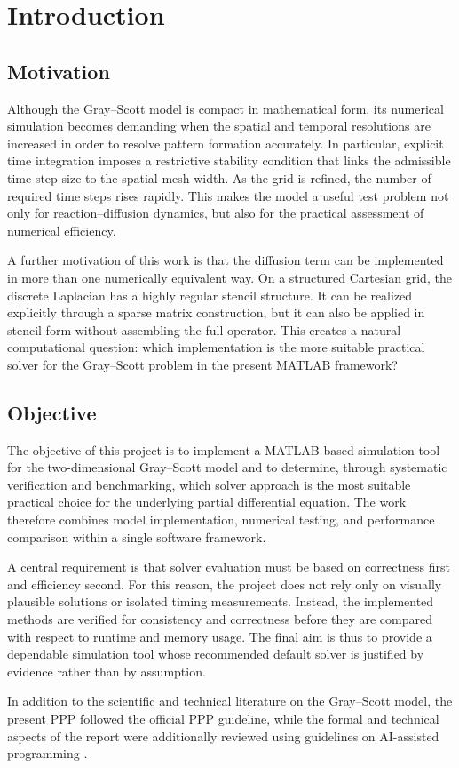 \chapter{Introduction}

\section{Motivation}

Although the Gray--Scott model is compact in mathematical form, its numerical simulation becomes demanding when the spatial and temporal resolutions are increased in order to resolve pattern formation accurately. In particular, explicit time integration imposes a restrictive stability condition that links the admissible time-step size to the spatial mesh width. As the grid is refined, the number of required time steps rises rapidly. This makes the model a useful test problem not only for reaction--diffusion dynamics, but also for the practical assessment of numerical efficiency.

A further motivation of this work is that the diffusion term can be implemented in more than one numerically equivalent way. On a structured Cartesian grid, the discrete Laplacian has a highly regular stencil structure. It can be realized explicitly through a sparse matrix construction, but it can also be applied in stencil form without assembling the full operator. This creates a natural computational question: which implementation is the more suitable practical solver for the Gray--Scott problem in the present MATLAB framework?

\section{Objective}

The objective of this project is to implement a MATLAB-based simulation tool for the two-dimensional Gray--Scott model and to determine, through systematic verification and benchmarking, which solver approach is the most suitable practical choice for the underlying partial differential equation. The work therefore combines model implementation, numerical testing, and performance comparison within a single software framework.

A central requirement is that solver evaluation must be based on correctness first and efficiency second. For this reason, the project does not rely only on visually plausible solutions or isolated timing measurements. Instead, the implemented methods are verified for consistency and correctness before they are compared with respect to runtime and memory usage. The final aim is thus to provide a dependable simulation tool whose recommended default solver is justified by evidence rather than by assumption.

In addition to the scientific and technical literature on the Gray--Scott model, the present PPP followed the official PPP guideline, while the formal and technical aspects of the report were additionally reviewed using guidelines on AI-assisted programming \citep{ppp_guideline_2024, aiass_guideline_2025}.